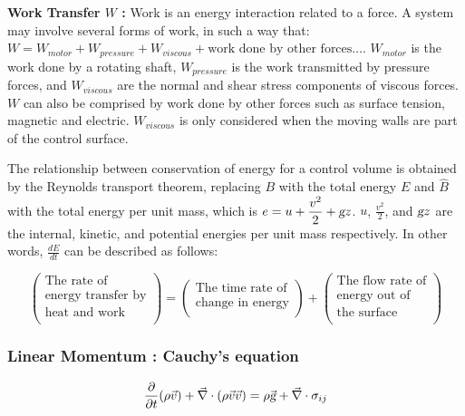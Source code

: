 \documentclass{article}
\begin{document}
\textbf{Work Transfer $W$ :} Work is an energy interaction related to a force. A system may involve several forms of work, in such a way that: $\displaystyle W = W_{motor} + W_{pressure} + W_{viscous} + \textrm{work done by other forces} \dots$. $W_{motor}$ is the work done by a rotating shaft,  $W_{pressure}$ is the work transmitted by pressure forces, and $W_{viscous}$ are the normal and shear stress components of viscous forces. $W$ can also be comprised by work done by other forces such as surface tension, magnetic and electric. $W_{viscous}$ is only considered when the moving walls are part of the control surface.

The relationship between conservation of energy for a control volume is obtained by the Reynolds transport theorem, replacing $B$ with the total energy $E$ and $\hat{B}$ with the total energy per unit mass, which is $e = \displaystyle u + \frac{v^2}{2} + \textsl{g} z$. $u$, $\displaystyle \frac{v^2}{2}$, and $\textsl{g} z$ are the internal, kinetic, and potential energies per unit mass respectively. In other words, $\displaystyle \frac{d E}{d t}$ can be described as follows:

$$ \left(
    \begin{array}{c}
        \textrm{The rate of} \\
        \textrm{energy transfer by} \\
        \textrm{heat and work} \\
    \end{array}
\right) = \left(
    \begin{array}{c}
        \textrm{The time rate of} \\
        \textrm{change in energy} \\
    \end{array}
\right) + \left(
    \begin{array}{c}
        \textrm{The flow rate of} \\
        \textrm{energy out of} \\
        \textrm{the surface} \\
    \end{array}
\right) $$

\subsubsection*{Linear Momentum : Cauchy's equation}

\begin{equation}
\frac{\partial}{\partial t} (\rho \vec{v}) + \vec{\nabla} \cdot (\rho \vec{v} \vec{v}) = \rho \vec{\textsl{g}} + \vec{\nabla} \cdot \sigma_{ij}
\end{equation}
\end{document}
